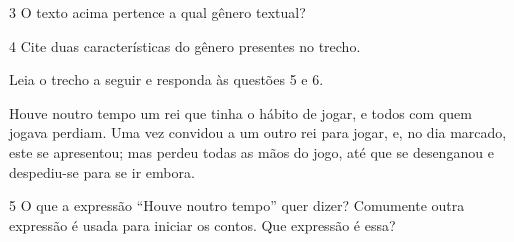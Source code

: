 \num{3} O texto acima pertence a qual gênero textual?


\num{4} Cite duas características do gênero presentes no trecho.




Leia o trecho a seguir e responda às questões 5 e 6.

\begin{myquote}

Houve noutro tempo um rei que tinha o hábito de jogar, e todos com
quem jogava perdiam. Uma vez convidou a um outro rei para jogar, e, no
dia marcado, este se apresentou; mas perdeu todas as mãos do jogo, até
que se desenganou e despediu-se para se ir embora.


\end{myquote}

\num{5} O que a expressão ``Houve noutro tempo'' quer dizer? Comumente outra
expressão é usada para iniciar os contos. Que expressão é essa?

